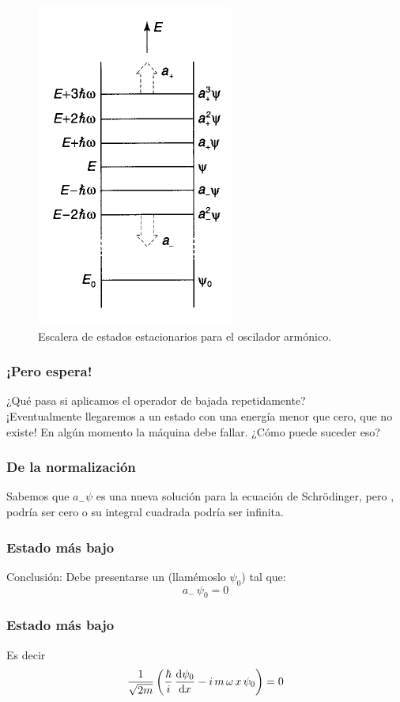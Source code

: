 \documentclass[12pt]{beamer}
\begin{document}
\begin{frame}[plain]
\begin{figure}[H]
    \centering
    \includegraphics[scale=0.55]{Imagenes/Operadores_escalera.png}
    \caption{Escalera de estados estacionarios para el oscilador armónico.}
    \label{fig:figura_002}
\end{figure}
\end{frame}
\begin{frame}
\frametitle{¡Pero espera!}
¿Qué pasa si aplicamos el operador de bajada repetidamente? 
\\
\bigskip
\pause
¡Eventualmente llegaremos a un estado con una energía menor que cero, que no existe! \pause En algún momento la máquina debe fallar. \pause ¿Cómo puede suceder eso? 
\end{frame}
\begin{frame}
\frametitle{De la normalización}
Sabemos que $a_{-} \psi$ es una nueva solución para la ecuación de Schrödinger, \pause pero , \pause podría ser cero o su integral cuadrada podría ser infinita.
\end{frame}
\begin{frame}
\frametitle{Estado más bajo}
Conclusión: \pause Debe presentarse un  (llamémoslo $\psi_{0}$) tal que:
\pause
\begin{equation}
a_{-} \, \psi_{0} = 0
\label{eq:ecuacion_02_047}
\end{equation}
\end{frame}
\begin{frame}
\frametitle{Estado más bajo}
Es decir
\begin{align*}
\dfrac{1}{\sqrt{2 m}} \left( \dfrac{\hbar}{i} \, \dv{\psi_{0}}{x} - i \, m \, \omega \, x \, \psi_{0} \right) = 0
\end{align*}
\end{frame}
\end{document}

